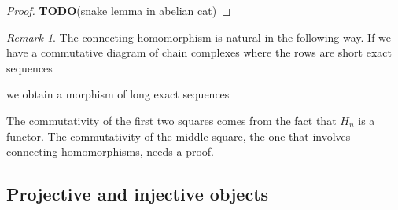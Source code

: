\documentclass{article}
\newcommand{\todo}{\textbf{TODO}}
\theoremstyle{plain}
\theoremstyle{definition}
\theoremstyle{remark}
\newtheorem*{remark}{Remark}
\begin{document}
\begin{proof}
    \todo (snake lemma in abelian cat)
\end{proof}

\begin{remark}
    The connecting homomorphism is natural in the following way. If we have a commutative diagram of chain complexes where the rows are short exact sequences
    \begin{center}
    \end{center}
    we obtain a morphism of long exact sequences
    \begin{center}
    \end{center}
    The commutativity of the first two squares comes from the fact that $H_n$ is a functor. The commutativity of the middle square, the one that involves connecting homomorphisms, needs a proof.
\end{remark}

\subsection{Projective and injective objects}
\end{document}
